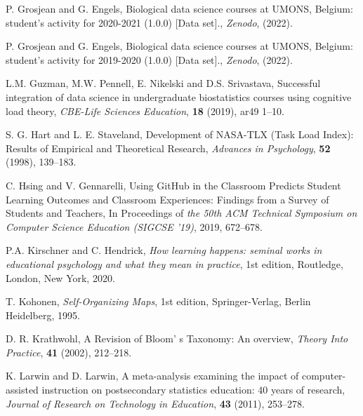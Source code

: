 \documentclass{aims} %
\theoremstyle{definition}
\begin{document}
\begin{thebibliography}{99}
     \newblock P. Grosjean and G. Engels,
     \newblock Biological data science courses at UMONS, Belgium: student's activity for 2020-2021 (1.0.0) [Data set].,
     \newblock \emph{Zenodo}, (2022).

     \newblock P. Grosjean and G. Engels,
     \newblock Biological data science courses at UMONS, Belgium: student's activity for 2019-2020 (1.0.0) [Data set].,
     \newblock \emph{Zenodo}, (2022).

     \newblock L.M. Guzman, M.W. Pennell, E. Nikelski and D.S. Srivastava,
     \newblock Successful integration of data science in undergraduate biostatistics courses using cognitive load theory,
     \newblock \emph{CBE-Life Sciences Education}, \textbf{18} (2019), ar49 1--10.

     \newblock S. G. Hart and L. E. Staveland,
     \newblock Development of NASA-TLX (Task Load Index): Results of Empirical and Theoretical Research,
     \newblock \emph{Advances in Psychology}, \textbf{52} (1998), 139--183.

     \newblock C. Hsing and V. Gennarelli,
     \newblock Using GitHub in the Classroom Predicts Student Learning Outcomes and Classroom Experiences: Findings from a Survey of Students and Teachers,
     \newblock In Proceedings of \emph{the 50th ACM Technical Symposium on Computer Science Education (SIGCSE '19)}, 2019, 672–678.

     \newblock P.A. Kirschner and C. Hendrick,
     \newblock \emph{How learning happens: seminal works in educational psychology and what they mean in practice},
     \newblock 1st edition, Routledge, London, New York, 2020.

     \newblock T.  Kohonen,
     \newblock \emph{Self-Organizing Maps},
     \newblock 1st edition, Springer-Verlag, Berlin Heidelberg, 1995.

     \newblock  D. R. Krathwohl,
     \newblock A Revision of Bloom' s Taxonomy: An overview,
     \newblock \emph{Theory Into Practice}, \textbf{41} (2002), 212--218.

     \newblock  K. Larwin and D. Larwin,
     \newblock A meta-analysis examining the impact of computer-assisted instruction on postsecondary statistics education: 40 years of research,
     \newblock \emph{Journal of Research on Technology in Education}, \textbf{43} (2011), 253--278.


\end{thebibliography}
\end{document}
